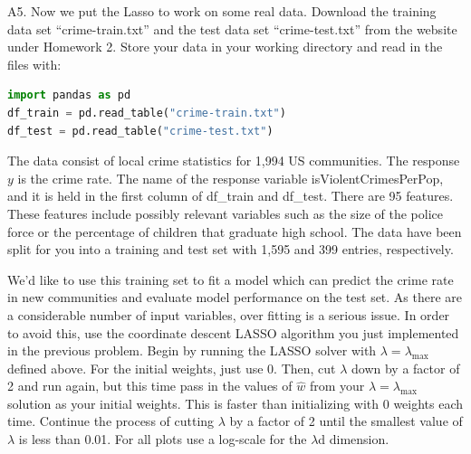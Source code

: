 \documentclass{article}
\newcommand{\1}{\mathbf{1}}
\begin{document}
\newpage
A5. Now we put the Lasso to work on some real data.  Download the training data set “crime-train.txt” and the test data set “crime-test.txt” from the website under Homework 2.  Store your data in your working directory and read in the files with:
\begin{lstlisting}[language=Python]
import pandas as pd
df_train = pd.read_table("crime-train.txt")
df_test = pd.read_table("crime-test.txt")
\end{lstlisting}

The data consist of local crime statistics for 1,994 US communities. The response $y$ is the crime rate. The name of the response variable isViolentCrimesPerPop, and it is held in the first column of df\_train and df\_test. There are 95 features. These features include possibly relevant variables such as the size of the police force or the percentage of children that graduate high school. The data have been split for you into a training and test set with 1,595 and 399 entries, respectively.

We’d like to use this training set to fit a model which can predict the crime rate in new communities and evaluate model performance on the test set. As there are a considerable number of input variables, over fitting is a serious issue. In order to avoid this, use the coordinate descent LASSO algorithm you just implemented in the previous problem. Begin by running the LASSO solver with $\lambda = \lambda_{\max}$ defined above. For the initial weights, just use 0. Then, cut $\lambda$ down by a factor of 2 and run again, but this time pass in the values of $\widehat w$ from your $\lambda = \lambda_{\max}$ solution as your initial weights. This is faster than initializing with 0 weights each time. Continue the process of cutting $\lambda$ by a factor of 2 until the smallest value of $\lambda$ is less than 0.01. For all plots use a log-scale for the $\lambda$d dimension.
\end{document}

